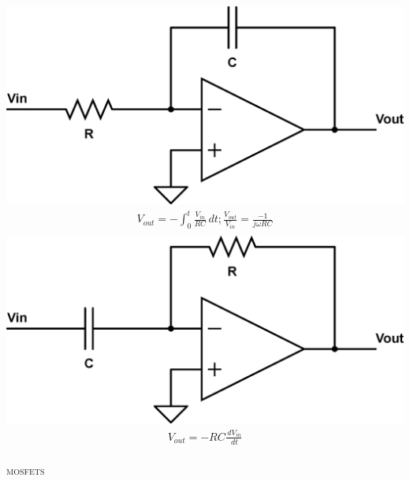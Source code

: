 \documentclass[10pt,letterpaper,english]{article}
\begin{document}
\begin{multicols}{2}
\includegraphics[scale=0.2]{opamp-integrator.eps}
\begin{align*}
V_{out} = -\int_0^t \frac{V_{in}}{RC} \,dt; \frac{V_{out}}{V_{in}} = \frac{-1}{j \omega RC} \tag*{Integrator / Low-pass}\\
\end{align*}
\includegraphics[scale=0.2]{opamp-differentiator.eps}
\begin{align*}
V_{out} = -RC \frac{\,dV_{in}}{\,dt} \tag*{Differentiator / High-pass}\\
\end{align*}
\end{multicols}


\textsc{mosfets}\\
\end{document}
